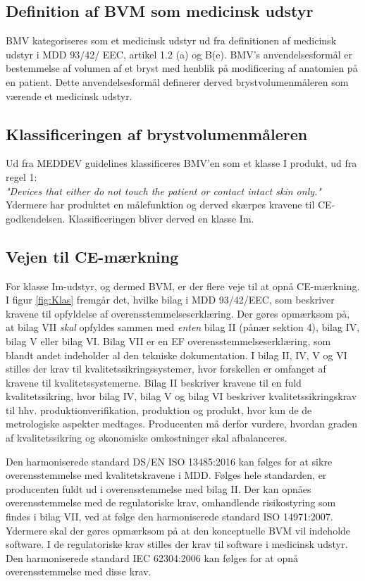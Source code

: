 \subsection{Definition af BVM som medicinsk udstyr}

BMV kategoriseres som et medicinsk udstyr ud fra definitionen af medicinsk udstyr i MDD 93/42/ EEC, artikel 1.2 (a) og B(e). BMV's anvendelsesformål er bestemmelse af volumen af et bryst med henblik på modificering af anatomien på en patient. Dette anvendelsesformål definerer derved brystvolumenmåleren som værende et medicinsk udstyr. 

\subsection{Klassificeringen af brystvolumenmåleren}

Ud fra MEDDEV guidelines klassificeres BMV'en som et klasse I produkt, ud fra regel 1: \\
\textit{"Devices that either do not touch the patient or contact intact skin only."} \\
Ydermere har produktet en målefunktion og derved skærpes kravene til CE-godkendelsen. Klassificeringen bliver derved en klasse Im.

\subsection{Vejen til CE-mærkning}

For klasse Im-udstyr, og dermed BVM, er der flere veje til at opnå CE-mærkning. I figur \ref{fig:Klas} fremgår det, hvilke bilag i MDD 93/42/EEC, som beskriver kravene til opfyldelse af overensstemmelseserklæring. Der gøres opmærksom på, at bilag VII \textit{skal} opfyldes sammen med \textit{enten} bilag II (pånær sektion 4), bilag IV, bilag V eller bilag VI. Bilag VII er en EF overensstemmelseserklæring, som blandt andet indeholder al den tekniske dokumentation. I bilag II, IV, V og VI stilles der krav til kvalitetssikringssystemer, hvor forskellen er omfanget af kravene til kvalitetssystemerne. Bilag II beskriver kravene til en fuld kvalitetssikring, hvor bilag IV, bilag V og bilag VI beskriver kvalitetssikringskrav til hhv. produktionverifikation, produktion og produkt, hvor kun de de metrologiske aspekter medtages. Producenten må derfor vurdere, hvordan graden af kvalitetssikring og økonomiske omkostninger skal afbalanceres.   

    Den harmoniserede standard DS/EN ISO 13485:2016 kan følges for at sikre overensstemmelse med kvalitetskravene i MDD. Følges hele standarden, er producenten fuldt ud i overensstemmelse med bilag II.
    Der kan opnåes overensstemmelse med de regulatoriske krav, omhandlende risikostyring som findes i bilag VII, ved at følge den harmoniserede standard ISO 14971:2007.
Ydermere skal der gøres opmærksom på at den konceptuelle BVM vil indeholde software. I de regulatoriske krav stilles der krav til software i medicinsk udstyr. Den harmoniserede standard IEC 62304:2006 kan følges for at opnå overensstemmelse med disse krav.   


